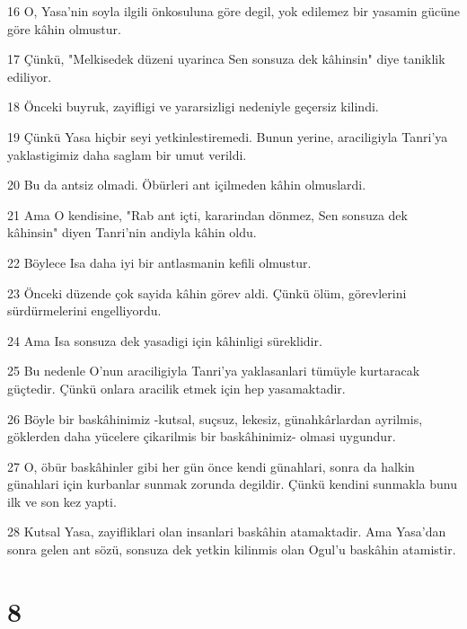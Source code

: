 \par 16 O, Yasa'nin soyla ilgili önkosuluna göre degil, yok edilemez bir yasamin gücüne göre kâhin olmustur.
\par 17 Çünkü, "Melkisedek düzeni uyarinca Sen sonsuza dek kâhinsin" diye taniklik ediliyor.
\par 18 Önceki buyruk, zayifligi ve yararsizligi nedeniyle geçersiz kilindi.
\par 19 Çünkü Yasa hiçbir seyi yetkinlestiremedi. Bunun yerine, araciligiyla Tanri'ya yaklastigimiz daha saglam bir umut verildi.
\par 20 Bu da antsiz olmadi. Öbürleri ant içilmeden kâhin olmuslardi.
\par 21 Ama O kendisine, "Rab ant içti, kararindan dönmez, Sen sonsuza dek kâhinsin" diyen Tanri'nin andiyla kâhin oldu.
\par 22 Böylece Isa daha iyi bir antlasmanin kefili olmustur.
\par 23 Önceki düzende çok sayida kâhin görev aldi. Çünkü ölüm, görevlerini sürdürmelerini engelliyordu.
\par 24 Ama Isa sonsuza dek yasadigi için kâhinligi süreklidir.
\par 25 Bu nedenle O'nun araciligiyla Tanri'ya yaklasanlari tümüyle kurtaracak güçtedir. Çünkü onlara aracilik etmek için hep yasamaktadir.
\par 26 Böyle bir baskâhinimiz -kutsal, suçsuz, lekesiz, günahkârlardan ayrilmis, göklerden daha yücelere çikarilmis bir baskâhinimiz- olmasi uygundur.
\par 27 O, öbür baskâhinler gibi her gün önce kendi günahlari, sonra da halkin günahlari için kurbanlar sunmak zorunda degildir. Çünkü kendini sunmakla bunu ilk ve son kez yapti.
\par 28 Kutsal Yasa, zayifliklari olan insanlari baskâhin atamaktadir. Ama Yasa'dan sonra gelen ant sözü, sonsuza dek yetkin kilinmis olan Ogul'u baskâhin atamistir.

\chapter{8}

